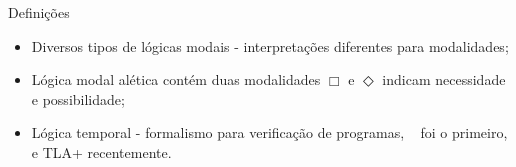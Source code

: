 \begin{frame}{Definições}
    \begin{itemize}
        \item Diversos tipos de lógicas modais - interpretações diferentes para modalidades;
        \item Lógica modal alética contém duas modalidades \(\Box\) e \(\Diamond\) indicam necessidade e possibilidade;
        \item Lógica temporal - formalismo para verificação de programas, ~\cite{pnueli1977temporal} foi o primeiro,
         e TLA+ recentemente.
    \end{itemize}
\end{frame}